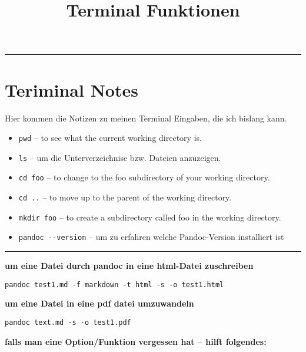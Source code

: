 \documentclass[]{article}
\title{Terminal Funktionen}
\author{}
\date{}
\begin{document}
\maketitle


{
\hypersetup{linkcolor=black}
\setcounter{tocdepth}{2}
\tableofcontents
}
\begin{center}\rule{0.5\linewidth}{\linethickness}\end{center}

\section{Teriminal Notes}\label{teriminal-notes}

Hier kommen die Notizen zu meinen Terminal Eingaben, die ich bislang
kann.

\begin{itemize}
\itemsep1pt\parskip0pt
\item
  \texttt{pwd} -- to see what the current working directory is.
\item
  \texttt{ls} -- um die Unterverzeichnise bzw. Dateien anzuzeigen.
\item
  \texttt{cd foo} -- to change to the foo subdirectory of your working
  directory.
\item
  \texttt{cd ..} -- to move up to the parent of the working directory.
\item
  \texttt{mkdir foo} -- to create a subdirectory called foo in the
  working directory.
\item
  \texttt{pandoc -\/-version} -- um zu erfahren welche Pandoc-Version
  installiert ist
\end{itemize}

\begin{center}\rule{0.5\linewidth}{\linethickness}\end{center}

\textbf{um eine Datei durch pandoc in eine html-Datei zuschreiben}

\begin{verbatim}
pandoc test1.md -f markdown -t html -s -o test1.html
\end{verbatim}

\textbf{um eine Datei in eine pdf datei umzuwandeln}

\begin{verbatim}
pandoc text.md -s -o test1.pdf
\end{verbatim}

\textbf{falls man eine Option/Funktion vergessen hat -- hilft
folgendes:}
\end{document}

